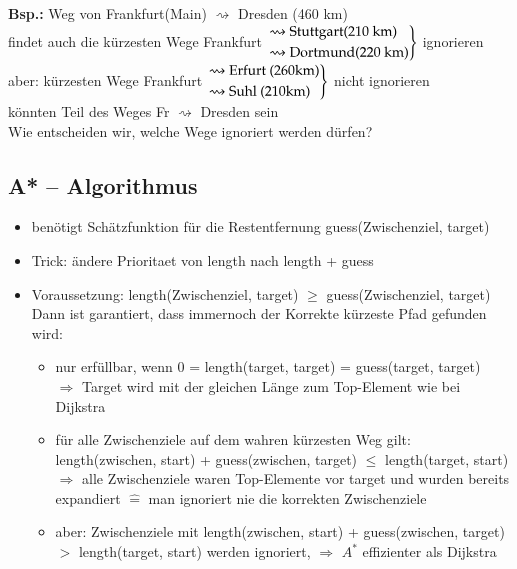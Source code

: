\documentclass[11pt, fleqn]{scrreprt}
\begin{document}
		\textbf{Bsp.:} Weg von Frankfurt(Main) $\rightsquigarrow$ Dresden (460 km)\\
		\hspace*{0.5cm} findet auch die kürzesten Wege Frankfurt $\begin{rcases}\rightsquigarrow \text{Stuttgart(210 km)} \\ \rightsquigarrow
		\text{Dortmund(220 km)} \end{rcases}$ ignorieren\\
		
		\hspace*{0.5cm} aber: kürzesten Wege Frankfurt $\begin{rcases} \rightsquigarrow \text{Erfurt (260km)} \\
		\rightsquigarrow \text{Suhl (210km)} \end{rcases}$ nicht ignorieren \\
		\hspace*{0.5cm} könnten Teil des Weges Fr $\rightsquigarrow$ Dresden sein\\
		
		Wie entscheiden wir, welche Wege ignoriert werden dürfen?
		
		
		\subsection*{A* – Algorithmus}
		\begin{itemize}
			\item benötigt Schätzfunktion für die Restentfernung guess(Zwischenziel, target)
			\item Trick: ändere Prioritaet von length nach length + guess
			\item Voraussetzung: length(Zwischenziel, target) $\geq$ guess(Zwischenziel, target)\\
			Dann ist garantiert, dass immernoch der Korrekte kürzeste Pfad gefunden wird: 
			\begin{itemize}
				\item nur erfüllbar, wenn 0 = length(target, target) = guess(target, target)\\
				$\Rightarrow$ Target wird mit der gleichen Länge zum Top-Element wie bei Dijkstra
				\item für alle Zwischenziele auf dem wahren kürzesten Weg gilt:\\ \hspace*{0.5cm} length(zwischen, start) + guess(zwischen, target) $\leq$ length(target, start)\\
				$\Rightarrow$ alle Zwischenziele waren Top-Elemente vor target und wurden bereits expandiert $\widehat{=}$ man ignoriert nie die korrekten Zwischenziele
				\item aber: Zwischenziele mit length(zwischen, start) + guess(zwischen, target) $>$ length(target, start) werden ignoriert, $\Rightarrow$ $A^*$ effizienter als Dijkstra
			\end{itemize}
		\end{itemize}
	
\end{document}
